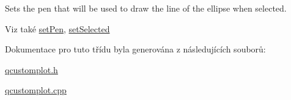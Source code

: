 Sets the pen that will be used to draw the line of the ellipse when selected. 

\begin{DoxySeeAlso}{Viz také}
\hyperlink{classQCPItemEllipse_adb81a663ed2420fcfa011e49f678d1a6}{set\+Pen}, \hyperlink{classQCPAbstractItem_a203de94ad586cc44d16c9565f49d3378}{set\+Selected} 
\end{DoxySeeAlso}


Dokumentace pro tuto třídu byla generována z následujících souborů\+:\begin{DoxyCompactItemize}
\item 
\hyperlink{qcustomplot_8h}{qcustomplot.\+h}\item 
\hyperlink{qcustomplot_8cpp}{qcustomplot.\+cpp}\end{DoxyCompactItemize}
